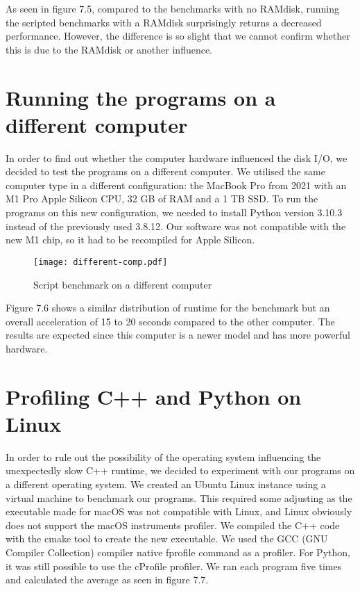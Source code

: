 As seen in figure 7.5, compared to the benchmarks with no RAMdisk, running the scripted benchmarks with a RAMdisk surprisingly returns a decreased performance. However, the difference is so slight that we cannot confirm whether this is due to the RAMdisk or another influence.

\section{Running the programs on a different computer}
In order to find out whether the computer hardware influenced the disk I/O, we decided to test the programs on a different computer. We utilised the same computer type in a different configuration: the MacBook Pro from 2021 with an M1 Pro Apple Silicon CPU, 32 GB of RAM and a 1 TB SSD. To run the programs on this new configuration, we needed to install Python version 3.10.3 instead of the previously used 3.8.12. Our software was not compatible with the new M1 chip, so it had to be recompiled for Apple Silicon.

\begin{figure}[H]
	\centering
	\texttt{[image: different-comp.pdf]}
	\caption{Script benchmark on a different computer}
	\label{figure:different-comp}
\end{figure}

Figure 7.6 shows a similar distribution of runtime for the benchmark but an overall acceleration of 15 to 20 seconds compared to the other computer. The results are expected since this computer is a newer model and has more powerful hardware.

\section{Profiling C++ and Python on Linux}
In order to rule out the possibility of the operating system influencing the unexpectedly slow C++ runtime, we decided to experiment with our programs on a different operating system. We created an Ubuntu Linux instance using a virtual machine to benchmark our programs. This required some adjusting as the executable made for macOS was not compatible with Linux, and Linux obviously does not support the macOS instruments profiler. We compiled the C++ code with the cmake tool to create the new executable. We used the GCC (GNU Compiler Collection) compiler native fprofile command as a profiler. For Python, it was still possible to use the cProfile profiler. We ran each program five times and calculated the average as seen in figure 7.7.

